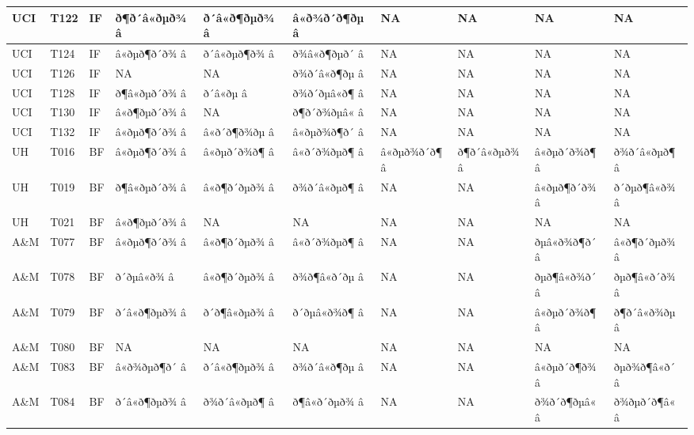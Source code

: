 \documentclass[]{article}
\begin{document}
\begin{table}[H]
\begin{tabular}{l|l|l|l|l|l|l|l|l|l}
\hline
UCI & T122 & IF & ð¶ð´â«ðµð¾ â & ð´â«ð¶ðµð¾ â & â«ð¾ð´ð¶ðµ â & NA & NA & NA & NA\\
\hline
UCI & T124 & IF & â«ðµð¶ð´ð¾ â & ð´â«ðµð¶ð¾ â & ð¾â«ð¶ðµð´ â & NA & NA & NA & NA\\
\hline
UCI & T126 & IF & NA & NA & ð¾ð´â«ð¶ðµ â & NA & NA & NA & NA\\
\hline
UCI & T128 & IF & ð¶â«ðµð´ð¾ â & ð´â«ðµ â & ð¾ð´ðµâ«ð¶ â & NA & NA & NA & NA\\
\hline
UCI & T130 & IF & â«ð¶ðµð´ð¾ â & NA & ð¶ð´ð¾ðµâ« â & NA & NA & NA & NA\\
\hline
UCI & T132 & IF & â«ðµð¶ð´ð¾ â & â«ð´ð¶ð¾ðµ â & â«ðµð¾ð¶ð´ â & NA & NA & NA & NA\\
\hline
UH & T016 & BF & â«ðµð¶ð´ð¾ â & â«ðµð´ð¾ð¶ â & â«ð´ð¾ðµð¶ â & â«ðµð¾ð´ð¶ â & ð¶ð´â«ðµð¾ â & â«ðµð´ð¾ð¶ â & ð¾ð´â«ðµð¶ â\\
\hline
UH & T019 & BF & ð¶â«ðµð´ð¾ â & â«ð¶ð´ðµð¾ â & ð¾ð´â«ðµð¶ â & NA & NA & â«ðµð¶ð´ð¾ â & ð´ðµð¶â«ð¾ â\\
\hline
UH & T021 & BF & â«ð¶ðµð´ð¾ â & NA & NA & NA & NA & NA & NA\\
\hline
A\&M & T077 & BF & â«ðµð¶ð´ð¾ â & â«ð¶ð´ðµð¾ â & â«ð´ð¾ðµð¶ â & NA & NA & ðµâ«ð¾ð¶ð´ â & â«ð¶ð´ðµð¾ â\\
\hline
A\&M & T078 & BF & ð´ðµâ«ð¾ â & â«ð¶ð´ðµð¾ â & ð¾ð¶â«ð´ðµ â & NA & NA & ðµð¶â«ð¾ð´ â & ðµð¶â«ð´ð¾ â\\
\hline
A\&M & T079 & BF & ð´â«ð¶ðµð¾ â & ð´ð¶â«ðµð¾ â & ð´ðµâ«ð¾ð¶ â & NA & NA & â«ðµð´ð¾ð¶ â & ð¶ð´â«ð¾ðµ â\\
\hline
A\&M & T080 & BF & NA & NA & NA & NA & NA & NA & NA\\
\hline
A\&M & T083 & BF & â«ð¾ðµð¶ð´ â & ð´â«ð¶ðµð¾ â & ð¾ð´â«ð¶ðµ â & NA & NA & â«ðµð´ð¶ð¾ â & ðµð¾ð¶â«ð´ â\\
\hline
A\&M & T084 & BF & ð´â«ð¶ðµð¾ â & ð¾ð´â«ðµð¶ â & ð¶â«ð´ðµð¾ â & NA & NA & ð¾ð´ð¶ðµâ« â & ð¾ðµð´ð¶â« â\\

\end{tabular}
\end{table}
\end{document}
